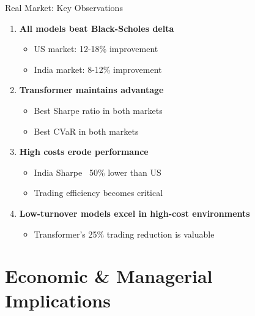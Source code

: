 \documentclass[aspectratio=169,11pt]{beamer}
\begin{document}
\begin{frame}{Real Market: Key Observations}
\begin{enumerate}
    \item \textbf{All models beat Black-Scholes delta}
    \begin{itemize}
        \item US market: 12-18\% improvement
        \item India market: 8-12\% improvement
    \end{itemize}
    
    \vspace{0.3cm}
    \item \textbf{Transformer maintains advantage}
    \begin{itemize}
        \item Best Sharpe ratio in both markets
        \item Best CVaR in both markets
    \end{itemize}
    
    \vspace{0.3cm}
    \item \textbf{High costs erode performance}
    \begin{itemize}
        \item India Sharpe ~50\% lower than US
        \item Trading efficiency becomes critical
    \end{itemize}
    
    \vspace{0.3cm}
    \item \textbf{Low-turnover models excel in high-cost environments}
    \begin{itemize}
        \item Transformer's 25\% trading reduction is valuable
    \end{itemize}
\end{enumerate}
\end{frame}

\section{Economic \& Managerial Implications}
\end{document}

